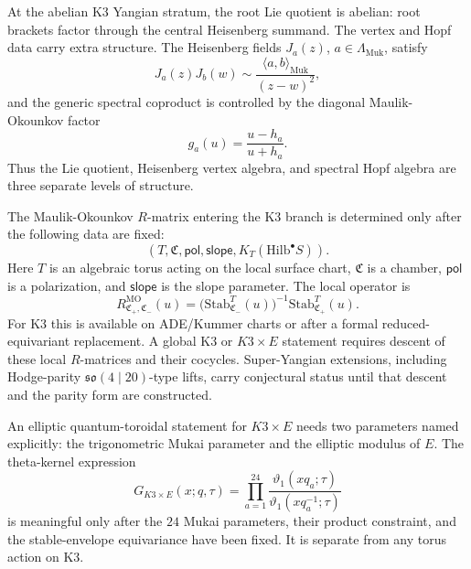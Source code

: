 \begin{proposition}
\label{prop:qtet-lie-vertex-separation}
At the abelian K3 Yangian stratum, the root Lie quotient is abelian:
root brackets factor through the central Heisenberg summand.  The
vertex and Hopf data carry extra structure.  The Heisenberg fields
\(J_a(z)\), \(a\in\Lambda_{\mathrm{Muk}}\), satisfy
\[
  J_a(z)J_b(w)\sim
  \frac{\langle a,b\rangle_{\mathrm{Muk}}}{(z-w)^2},
\]
and the generic spectral coproduct is controlled by the diagonal
Maulik-Okounkov factor
\[
  g_a(u)=\frac{u-h_a}{u+h_a}.
\]
Thus the Lie quotient, Heisenberg vertex algebra, and spectral Hopf
algebra are three separate levels of structure.
\end{proposition}

\begin{proposition}
\label{prop:qtet-stable-envelope-rmatrix}
The Maulik-Okounkov \(R\)-matrix entering the K3 branch is determined
only after the following data are fixed:
\[
  (T,\mathfrak C,\mathsf{pol},\mathsf{slope},
  K_T(\mathrm{Hilb}^{\bullet}S)).
\]
Here \(T\) is an algebraic torus acting on the local surface chart,
\(\mathfrak C\) is a chamber, \(\mathsf{pol}\) is a polarization, and
\(\mathsf{slope}\) is the slope parameter.  The local operator is
\[
  R^{\mathrm{MO}}_{\mathfrak C_+,\mathfrak C_-}(u)
  =
  \bigl(\mathrm{Stab}^{T}_{\mathfrak C_-}(u)\bigr)^{-1}
  \mathrm{Stab}^{T}_{\mathfrak C_+}(u).
\]
For K3 this is available on ADE/Kummer charts or after a formal
reduced-equivariant replacement.  A global K3 or \(K3\times E\)
statement requires descent of these local \(R\)-matrices and their
cocycles.  Super-Yangian extensions, including Hodge-parity
\(\mathfrak{so}(4\mid20)\)-type lifts, carry conjectural status until
that descent and the parity form are constructed.
\end{proposition}

\begin{remark}
\label{rem:qtet-elliptic-hypotheses}
An elliptic quantum-toroidal statement for \(K3\times E\) needs two
parameters named explicitly: the trigonometric Mukai parameter and the
elliptic modulus of \(E\).  The theta-kernel expression
\[
  G_{K3\times E}(x;q,\tau)
  =
  \prod_{a=1}^{24}
  \frac{\vartheta_1(xq_a;\tau)}
       {\vartheta_1(xq_a^{-1};\tau)}
\]
is meaningful only after the \(24\) Mukai parameters, their product
constraint, and the stable-envelope equivariance have been fixed.  It
is separate from any torus action on K3.
\end{remark}

